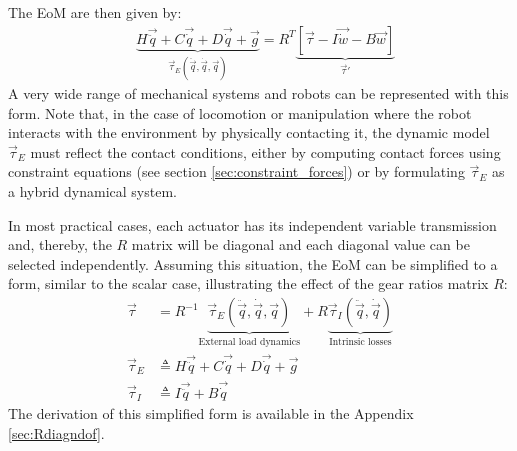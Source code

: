 The EoM are then given by:
%
\begin{align}
	&\underbrace{ H \vec{ \ddot{q} } + C\vec{ \dot{q} } + D \vec{ \dot{q} } + \vec{ g } }_{ \vec{\tau}_{E}(\ddot{\vec{q}},\dot{\vec{q}},\vec{q})}
		= R^T \underbrace{  \left[ 
		\vec{ \tau } - I \vec{ \dot{w} } - B \vec{ w }       
		\right]}_{ \vec{\tau}' } 
 \label{eq:eom_ndof}
\end{align}
%
A very wide range of mechanical systems and robots can be represented with this form. Note that, in the case of locomotion or manipulation where the robot interacts with the environment by physically contacting it, the dynamic model $\vec{\tau}_{E}$ must reflect the contact conditions, either by computing contact forces using constraint equations (see section \ref{sec:constraint_forces}) or by formulating $\vec{\tau}_{E}$ as a hybrid dynamical system.

In most practical cases, each actuator has its independent variable transmission and, thereby, the $R$ matrix will be diagonal and each diagonal value can be selected independently. Assuming this situation, the EoM can be simplified to a form, similar to the scalar case, illustrating the effect of the gear ratios matrix $R$: 
%
\begin{align}
	\vec{\tau} &= R^{-1} 
	\underbrace{ 
	\vec{\tau}_{E}(\ddot{\vec{q}},\dot{\vec{q}},\vec{q}) 
	}_{\text{External load dynamics}}
	+ R 
	\underbrace{ 
	\vec{\tau}_{I}(\ddot{\vec{q}},\dot{\vec{q}})
		}_{\text{Intrinsic losses}}
		\label{eq:eom_ndof2}
	\\ %
	\vec{\tau}_{E} &\triangleq H \vec{ \ddot{q} } + C\vec{ \dot{q} } + D \vec{ \dot{q} } + \vec{ g } \\
	\vec{\tau}_{I} &\triangleq I \vec{ \ddot{q} } + B \vec{ \dot{q} } 
\end{align}
%
The derivation of this simplified form is available in the Appendix \ref{sec:Rdiagndof}.

